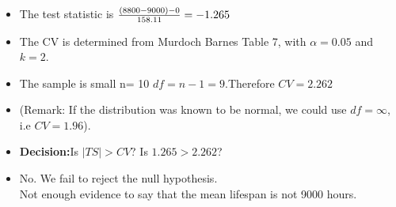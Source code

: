 \documentclass[a4paper,12pt]{article}
\begin{document}
\large
\begin{itemize}
\item The test statistic is ${(8800-9000) -0 \over  158.11} = -1.265$
\item The CV is determined from Murdoch Barnes Table 7, with $\alpha = 0.05$ and $k = 2$.
\item The sample is small n= 10 $df = n-1 = 9$.Therefore $CV = 2.262$
\item (Remark: If the distribution was known to be normal, we could use $df = \infty$, i.e $CV = 1.96$).
\end{itemize}
\medskip 

\large
\begin{itemize}


\item \textbf{Decision:}Is $|TS| >CV$? Is $1.265 > 2.262$?
\item No. We fail to reject the null hypothesis. \\
Not enough evidence to say that the mean lifespan is not 9000 hours.
\end{itemize}
\medskip 
\end{document}
